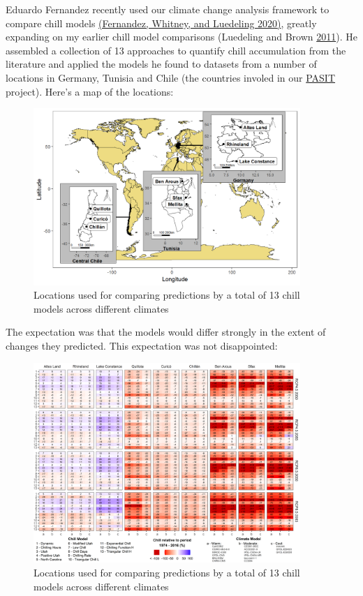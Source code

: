 \documentclass[
]{book}
\begin{document}
Eduardo Fernandez recently used our climate change analysis framework to compare chill models \href{https://www.sciencedirect.com/science/article/abs/pii/S1161030120301106}{(Fernandez, Whitney, and Luedeling \protect\hyperlink{ref-fernandez2020importance}{2020})}, greatly expanding on my earlier chill model comparisons (Luedeling and Brown \protect\hyperlink{ref-luedeling_global_2011}{2011}). He assembled a collection of 13 approaches to quantify chill accumulation from the literature and applied the models he found to datasets from a number of locations in Germany, Tunisia and Chile (the countries involed in our \href{https://pasitproject.de/}{PASIT} project). Here's a map of the locations:

\begin{figure}
\centering
\includegraphics[width=0.9\textwidth,height=\textheight]{pictures/Model_comp_map.png}
\caption{Locations used for comparing predictions by a total of 13 chill models across different climates}
\end{figure}

The expectation was that the models would differ strongly in the extent of changes they predicted. This expectation was not disappointed:

\begin{figure}
\centering
\includegraphics[width=0.9\textwidth,height=\textheight]{pictures/Model_comp_results.png}
\caption{Locations used for comparing predictions by a total of 13 chill models across different climates}
\end{figure}
\end{document}
